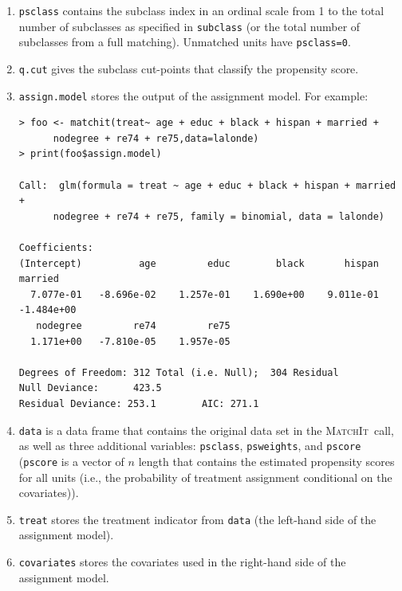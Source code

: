 \documentclass[oneside,letterpaper,titlepage]{article}
\newcommand{\MatchIt}{\textsc{MatchIt}}
\begin{document}
\begin{enumerate}
 \item \texttt{psclass} contains the subclass index in an ordinal
   scale from 1 to the total number of subclasses as specified in
   \texttt{subclass} (or the total number of subclasses from a full matching).  Unmatched units have \texttt{psclass=0}.
   
 \item \texttt{q.cut} gives the subclass cut-points that classify the
 propensity score.
   
 \item \texttt{assign.model} stores the output of the assignment
   model.  For example:
  
  \begin{footnotesize}
\begin{verbatim}
> foo <- matchit(treat~ age + educ + black + hispan + married +
      nodegree + re74 + re75,data=lalonde)
> print(foo$assign.model)

Call:  glm(formula = treat ~ age + educ + black + hispan + married +
      nodegree + re74 + re75, family = binomial, data = lalonde) 

Coefficients:
(Intercept)          age         educ        black       hispan      married  
  7.077e-01   -8.696e-02    1.257e-01    1.690e+00    9.011e-01   -1.484e+00  
   nodegree         re74         re75  
  1.171e+00   -7.810e-05    1.957e-05  

Degrees of Freedom: 312 Total (i.e. Null);  304 Residual
Null Deviance:      423.5 
Residual Deviance: 253.1        AIC: 271.1 
\end{verbatim} %
\end{footnotesize}

\item \texttt{data} is a data frame that contains the original data
  set in the \MatchIt\ call, as well as three additional variables:
  \texttt{psclass}, \texttt{psweights}, and \texttt{pscore}
  (\texttt{pscore} is a vector of $n$ length that contains the
  estimated propensity scores for all units (i.e., the probability of
  treatment assignment conditional on the covariates)).
  
\item \texttt{treat} stores the treatment indicator from \texttt{data}
  (the left-hand side of the assignment model).
  
\item \texttt{covariates} stores the covariates used in the right-hand
  side of the assignment model.
\end{enumerate}
\end{document}
